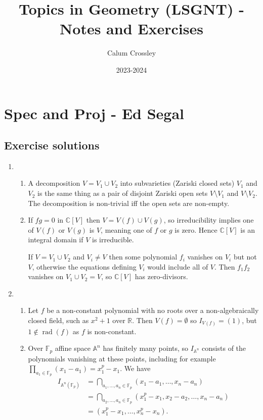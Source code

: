 \documentclass[a4paper]{article}
\title{Topics in Geometry (LSGNT) - Notes and Exercises}
\author{Calum Crossley}
\date{2023-2024}
\theoremstyle{definition}
\theoremstyle{remark}
\DeclareMathOperator{\rad}{rad}
\newcommand{\F}{\mathbb{F}}
\newcommand{\A}{\mathbb{A}}
\newcommand{\R}{\mathbb{R}}
\newcommand{\C}{\mathbb{C}}
\begin{document}
\maketitle

\section{Spec and Proj - Ed Segal}


\subsection*{Exercise solutions}

\begin{enumerate}

\item
\begin{enumerate}[label=(\alph*)]

\item 
A decomposition $V=V_1\cup V_2$ into subvarieties (Zariski
closed sets) $V_1$ and $V_2$ is the same thing as a pair of
disjoint Zariski open sets $V\setminus V_1$ and
$V\setminus V_2$. The decomposition is non-trivial iff the open
sets are non-empty.

\item
If $fg=0$ in $\C[V]$ then $V=V(f)\cup V(g)$, so irreducibility
implies one of $V(f)$ or $V(g)$ is $V$, meaning one of $f$ or
$g$ is zero. Hence $\C[V]$ is an integral domain if $V$ is
irreducible.

If $V=V_1\cup V_2$ and $V_i\ne V$ then some polynomial
$f_i$ vanishes on $V_i$ but not $V$, otherwise the equations
defining $V_i$ would include all of $V$. Then $f_1f_2$ vanishes
on $V_1\cup V_2=V$, so $\C[V]$ has zero-divisors.

\end{enumerate}

\item
\begin{enumerate}[label=(\alph*)]

\item 
Let $f$ be a non-constant polynomial with no roots over a non-algebraically
closed field, such as $x^2+1$ over $\R$. Then $V(f)=\emptyset$ so
$I_{V(f)}=(1)$, but $1\notin\rad(f)$ as $f$ is non-constant.

\item
Over $\F_p$ affine space $\A^n$ has finitely many points, so $I_{\A^n}$ consists
of the polynomials vanishing at these points, including for example
$\prod_{a_1\in\F_p}(x_1-a_1)=x_1^p-x_1$. We have
\begin{align*}
    I_{\A^n(\F_p)}
        &= \bigcap_{a_1,\ldots,a_n\in\F_p}(x_1-a_1,\ldots,x_n-a_n) \\
        &= \bigcap_{a_2,\ldots,a_n\in\F_p}(x_1^p-x_1,x_2-a_2,\ldots,x_n-a_n) \\
        &= (x_1^p-x_1,\ldots,x_n^p-x_n).
\end{align*}


\end{enumerate}
\end{enumerate}
\end{document}
